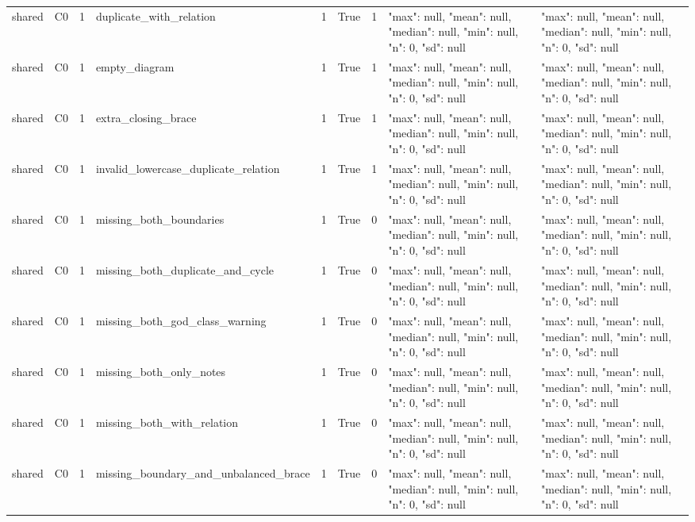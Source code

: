 \begin{tabular}{lllllllll}
shared & C0 & 1 & duplicate\_with\_relation & 1 & True & 1 & {"max": null, "mean": null, "median": null, "min": null, "n": 0, "sd": null} & {"max": null, "mean": null, "median": null, "min": null, "n": 0, "sd": null} \\
shared & C0 & 1 & empty\_diagram & 1 & True & 1 & {"max": null, "mean": null, "median": null, "min": null, "n": 0, "sd": null} & {"max": null, "mean": null, "median": null, "min": null, "n": 0, "sd": null} \\
shared & C0 & 1 & extra\_closing\_brace & 1 & True & 1 & {"max": null, "mean": null, "median": null, "min": null, "n": 0, "sd": null} & {"max": null, "mean": null, "median": null, "min": null, "n": 0, "sd": null} \\
shared & C0 & 1 & invalid\_lowercase\_duplicate\_relation & 1 & True & 1 & {"max": null, "mean": null, "median": null, "min": null, "n": 0, "sd": null} & {"max": null, "mean": null, "median": null, "min": null, "n": 0, "sd": null} \\
shared & C0 & 1 & missing\_both\_boundaries & 1 & True & 0 & {"max": null, "mean": null, "median": null, "min": null, "n": 0, "sd": null} & {"max": null, "mean": null, "median": null, "min": null, "n": 0, "sd": null} \\
shared & C0 & 1 & missing\_both\_duplicate\_and\_cycle & 1 & True & 0 & {"max": null, "mean": null, "median": null, "min": null, "n": 0, "sd": null} & {"max": null, "mean": null, "median": null, "min": null, "n": 0, "sd": null} \\
shared & C0 & 1 & missing\_both\_god\_class\_warning & 1 & True & 0 & {"max": null, "mean": null, "median": null, "min": null, "n": 0, "sd": null} & {"max": null, "mean": null, "median": null, "min": null, "n": 0, "sd": null} \\
shared & C0 & 1 & missing\_both\_only\_notes & 1 & True & 0 & {"max": null, "mean": null, "median": null, "min": null, "n": 0, "sd": null} & {"max": null, "mean": null, "median": null, "min": null, "n": 0, "sd": null} \\
shared & C0 & 1 & missing\_both\_with\_relation & 1 & True & 0 & {"max": null, "mean": null, "median": null, "min": null, "n": 0, "sd": null} & {"max": null, "mean": null, "median": null, "min": null, "n": 0, "sd": null} \\
shared & C0 & 1 & missing\_boundary\_and\_unbalanced\_brace & 1 & True & 0 & {"max": null, "mean": null, "median": null, "min": null, "n": 0, "sd": null} & {"max": null, "mean": null, "median": null, "min": null, "n": 0, "sd": null} \\

\end{tabular}
